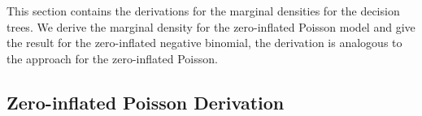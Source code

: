 
This section contains the derivations for the marginal densities for the decision trees. We derive the marginal density for the zero-inflated Poisson model and give the result for the zero-inflated negative binomial, the derivation is analogous to the approach for the zero-inflated Poisson. 

\subsection{Zero-inflated Poisson Derivation}


